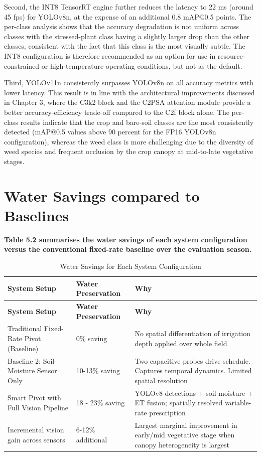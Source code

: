\documentclass[12pt,a4paper]{report}
\renewcommand{\arraystretch}{1.25}
\begin{document}
Second, the INT8 TensorRT engine further reduces the latency to 22 ms (around 45 fps) for YOLOv8n, at the expense of an additional 0.8 mAP@0.5 points. The per-class analysis shows that the accuracy degradation is not uniform across classes with the stressed-plant class having a slightly larger drop than the other classes, consistent with the fact that this class is the most visually subtle. The INT8 configuration is therefore recommended as an option for use in resource-constrained or high-temperature operating conditions, but not as the default.

Third, YOLOv11n consistently surpasses YOLOv8n on all accuracy metrics with lower latency. This result is in line with the architectural improvements discussed in Chapter 3, where the C3k2 block and the C2PSA attention module provide a better accuracy-efficiency trade-off compared to the C2f block alone. The per-class results indicate that the crop and bare-soil classes are the most consistently detected (mAP@0.5 values above 90 percent for the FP16 YOLOv8n configuration), whereas the weed class is more challenging due to the diversity of weed species and frequent occlusion by the crop canopy at mid-to-late vegetative stages.

\section{Water Savings compared to Baselines}

\textbf{Table 5.2 summarises the water savings of each system configuration versus the conventional fixed-rate baseline over the evaluation season.}

\begingroup
\small
\setlength{\parskip}{0pt}
\setlength{\tabcolsep}{4pt}
\renewcommand{\arraystretch}{1.2}
\begin{longtable}{|P{0.28\textwidth}|P{0.18\textwidth}|P{0.42\textwidth}|}
\caption{Water Savings for Each System Configuration}\\
\hline
\textbf{System Setup} & \textbf{Water Preservation} & \textbf{Why} \\ \hline
\endfirsthead
\hline
\textbf{System Setup} & \textbf{Water Preservation} & \textbf{Why} \\ \hline
\endhead
Traditional Fixed-Rate Pivot (Baseline) & 0\% saving & No spatial differentiation of irrigation depth applied over whole field \\ \hline
Baseline 2: Soil-Moisture Sensor Only & 10-13\% saving & Two capacitive probes drive schedule. Captures temporal dynamics. Limited spatial resolution \\ \hline
Smart Pivot with Full Vision Pipeline & 18 - 23\% saving & YOLOv8 detections + soil moisture + ET fusion; spatially resolved variable-rate prescription \\ \hline
Incremental vision gain across sensors & 6-12\% additional & Largest marginal improvement in early/mid vegetative stage when canopy heterogeneity is largest \\ \hline
\end{longtable}
\endgroup
\end{document}
